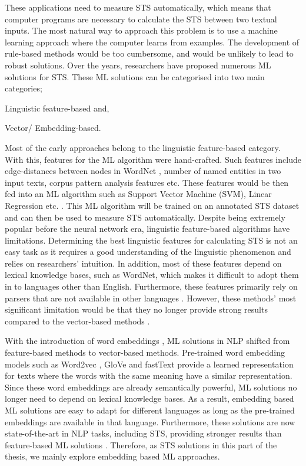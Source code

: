 These applications need to measure STS automatically, which means that computer programs are necessary to calculate the STS between two textual inputs. The most natural way to approach this problem is to use a machine learning approach where the computer learns from examples. The development of rule-based methods would be too cumbersome, and would be unlikely to lead to robust solutions. Over the years, researchers have proposed numerous ML solutions for STS. These ML solutions can be categorised into two main categories; 
 \begin{enumerate*}[label=(\alph*)]
 	\item Linguistic feature-based and,
 	\item Vector/ Embedding-based.
 \end{enumerate*}
Most of the early approaches belong to the linguistic feature-based category. With this, features for the ML algorithm were hand-crafted. Such features include edge-distances between nodes in WordNet \autocite{10.1145/219717.219748}, number of named entities in two input texts, corpus pattern analysis features etc. These features would be then fed into an ML algorithm such as Support Vector Machine (SVM), Linear Regression etc. \autocite{bechara-etal-2015-miniexperts}. This ML algorithm will be trained on an annotated STS dataset and can then be used to measure STS automatically. Despite being extremely popular before the neural network era, linguistic feature-based algorithms have limitations. Determining the best linguistic features for calculating STS is not an easy task as it requires a good understanding of the linguistic phenomenon and relies on researchers' intuition. In addition, most of these features depend on lexical knowledge bases, such as WordNet, which makes it difficult to adopt them in to languages other than English. Furthermore, these features primarily rely on parsers that are not available in other languages \autocite{2016IJCA}. However, these methods' most significant limitation would be that they no longer provide strong results compared to the vector-based methods \autocite{cer-etal-2017-semeval}. 

With the introduction of word embeddings \autocite{DBLP:journals/corr/abs-1301-3781}, ML solutions in NLP shifted from feature-based methods to vector-based methods. Pre-trained word embedding models such as Word2vec \autocite{DBLP:journals/corr/abs-1301-3781}, GloVe \autocite{pennington-etal-2014-glove} and  fastText \autocite{mikolov-etal-2018-advances} provide a learned representation for texts where the words with the same meaning have a similar representation. Since these word embeddings are already semantically powerful, ML solutions no longer need to depend on lexical knowledge bases. As a result, embedding based ML solutions are easy to adapt for different languages as long as the pre-trained embeddings are available in that language. Furthermore, these solutions are now state-of-the-art in NLP tasks, including STS, providing stronger results than feature-based ML solutions \autocite{cer-etal-2017-semeval}. Therefore, as STS solutions in this part of the thesis,  we mainly explore embedding based ML approaches.

